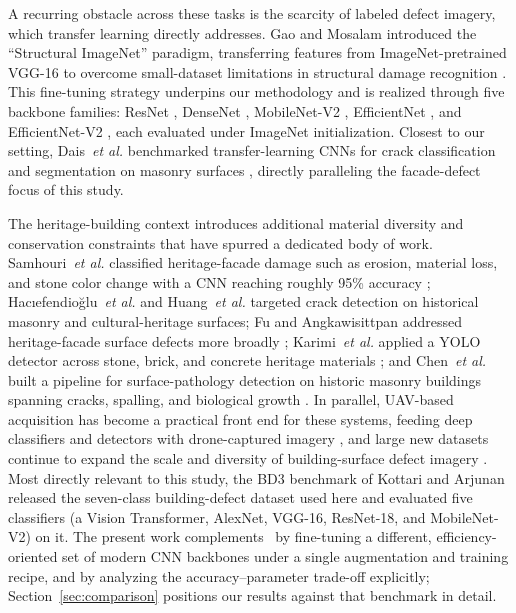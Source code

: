 \documentclass[conference]{IEEEtran}
\begin{document}
A recurring obstacle across these tasks is the scarcity of labeled defect imagery, which transfer learning directly addresses. Gao and Mosalam introduced the ``Structural ImageNet'' paradigm, transferring features from ImageNet-pretrained VGG-16 \cite{ref23} to overcome small-dataset limitations in structural damage recognition \cite{ref22}. This fine-tuning strategy underpins our methodology and is realized through five backbone families: ResNet \cite{ref24}, DenseNet \cite{ref25}, MobileNet-V2 \cite{ref26}, EfficientNet \cite{ref27}, and EfficientNet-V2 \cite{ref28}, each evaluated under ImageNet initialization. Closest to our setting, Dais~\textit{et al.} benchmarked transfer-learning CNNs for crack classification and segmentation on masonry surfaces \cite{ref29}, directly paralleling the facade-defect focus of this study.

The heritage-building context introduces additional material diversity and conservation constraints that have spurred a dedicated body of work. Samhouri~\textit{et al.} classified heritage-facade damage such as erosion, material loss, and stone color change with a CNN reaching roughly 95\% accuracy \cite{ref30}; Hacıefendioğlu~\textit{et al.} \cite{ref31} and Huang~\textit{et al.} \cite{ref34} targeted crack detection on historical masonry and cultural-heritage surfaces; Fu and Angkawisittpan addressed heritage-facade surface defects more broadly \cite{ref32}; Karimi~\textit{et al.} applied a YOLO detector across stone, brick, and concrete heritage materials \cite{ref33}; and Chen~\textit{et al.} built a pipeline for surface-pathology detection on historic masonry buildings spanning cracks, spalling, and biological growth \cite{ref35}. In parallel, UAV-based acquisition has become a practical front end for these systems, feeding deep classifiers and detectors with drone-captured imagery \cite{ref36,ref37,ref38}, and large new datasets continue to expand the scale and diversity of building-surface defect imagery \cite{ref39}. Most directly relevant to this study, the BD3 benchmark of Kottari and Arjunan~\cite{ref40} released the seven-class building-defect dataset used here and evaluated five classifiers (a Vision Transformer, AlexNet, VGG-16, ResNet-18, and MobileNet-V2) on it. The present work complements~\cite{ref40} by fine-tuning a different, efficiency-oriented set of modern CNN backbones under a single augmentation and training recipe, and by analyzing the accuracy--parameter trade-off explicitly; Section~\ref{sec:comparison} positions our results against that benchmark in detail.
\end{document}
